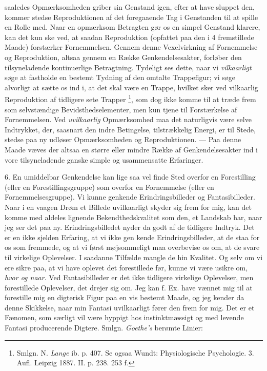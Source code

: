 \documentclass[12pt,a4paper,openany]{book}
\newcommand{\opage}[1]{\marginnote{\footnotesize\textit{[#1]}}}
\begin{document}
saaledes Opmærksomheden griber sin Genstand igen, efter at have sluppet den,
kommer stedse Reproduktionen af det foregaaende Tag i Genstanden til at spille
en Rolle med. Naar en opmærksom Betragten gør os en simpel Genstand klarere,
kan det kun ske ved, at saadan Reproduktion (opfattet paa den i 4 fremstillede
Maade) forstærker Fornemmelsen. Gennem denne Vexelvirkning af Fornemmelse og
Reproduktion, altsaa gennem en Række Genkendelsesakter, forløber den
tilsyneladende kontinuerlige Betragtning. Tydeligt ses dette, naar vi
\emph{vilkaarligt} søge at fastholde en bestemt Tydning af den omtalte
Trappefigur; vi søge alvorligt at sætte os ind i, at det skal være en Trappe,
hvilket sker ved vilkaarlig Reproduktion af tidligere sete Trapper%
\footnote[2]{Smlgn. N. \emph{Lange} ib. p. 407. Se ogsaa Wundt: Physiologische
Psychologie. 3. Aufl. Leipzig 1887. II. p. 238. 253 f.}, som dog ikke komme til
at træde frem som selvstændige Bevidsthedselementer, men kun tjene til
Forstærkelse af Fornemmelsen. Ved \emph{uvilkaarlig} Opmærksomhed maa det
naturligvis være selve Indtrykket, der, saasnart den indre Betingelse,
tilstrækkelig Energi, er til Stede, stedse paa ny udløser Opmærksomheden og
Reproduktionen. --- Paa denne Maade væves der altsaa en større eller mindre
Række af Genkendelsesakter ind i vore tilsyneladende ganske simple og
usammensatte Erfaringer.

6. En umiddelbar Genkendelse kan lige saa vel finde Sted overfor en
Forestilling (eller en Forestillingsgruppe) som overfor en Fornemmelse (eller
en Fornemmelsesgruppe). Vi kunne genkende Erindringsbilleder og
Fantasibilleder. Naar i en vaagen Drøm et Billede uvilkaarligt skyder sig frem
for mig, kan det komme med aldeles lignende Bekendthedskvalitet som den, et
Landskab har, naar jeg ser det paa ny. Erindringsbilledet nyder da godt af de
tidligere Indtryk. Det er en ikke sjelden Erfaring, at vi ikke gen%
\setcounter{footnote}{0}%
\opage{15}kende Erindringsbilleder, at de staa for os som fremmede, og at vi
først møjsommeligt maa overbevise os om, at de svare til virkelige Oplevelser.
I saadanne Tilfælde mangle de hin Kvalitet. Og selv om vi ere sikre paa, at vi
have oplevet det forestillede før, kunne vi være usikre om, \emph{hvor og
naar}. Ved Fantasibilleder er det ikke tidligere virkelige Oplevelser, men
forestillede Oplevelser, det drejer sig om. Jeg kan f. Ex. have vænnet mig til
at forestille mig en digterisk Figur paa en vis bestemt Maade, og jeg kender da
denne Skikkelse, naar min Fantasi uvilkaarligt fører den frem for mig. Det er
et Fænomen, som særligt vil være hyppigt hos instinktmæssigt og med levende
Fantasi producerende Digtere. Smlgn. \emph{Goethe's} berømte Linier:
\end{document}
